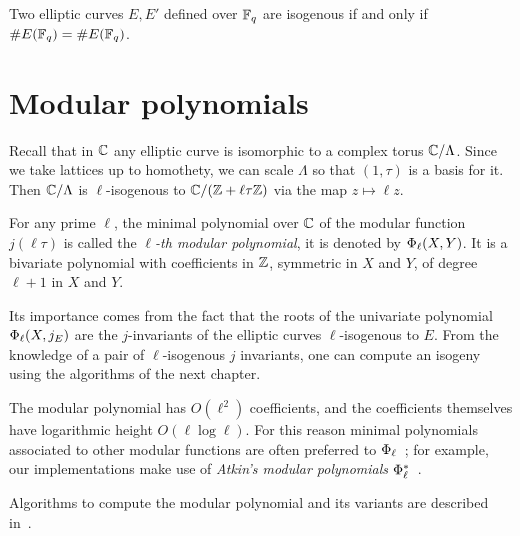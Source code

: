 \begin{theorem}
  Two elliptic curves $E,E'$ defined over $\mathbb{F}_q$ are isogenous if and
  only if $\# E(\mathbb{F}_q)=\# E(\mathbb{F}_q)$.
\end{theorem}


\section{Modular polynomials}
\label{sec:modular-polynomials}
Recall that in $\mathbb{C}$ any elliptic curve is isomorphic to a complex
torus $\mathbb{C}/\Lambda$. Since we take lattices up to homothety, we can
scale $\Lambda$ so that $(1,\tau)$ is a basis for it. Then
$\mathbb{C}/\Lambda$ is $\ell$-isogenous to $\mathbb{C}/(\mathbb{Z}+\ell\tau\mathbb{Z})$ via the map
$z\mapsto\ell z$.

For any prime $\ell$, the minimal polynomial over $\mathbb{C}$ of the modular
function $j(\ell\tau)$ is called the \emph{$\ell$-th modular polynomial}, it is denoted by
$\Phi_\ell(X,Y)$. It is a bivariate polynomial with coefficients in $\mathbb{Z}$,
symmetric in $X$ and $Y$, of degree $\ell+1$ in $X$ and $Y$.

Its importance comes from the fact that the roots of the univariate
polynomial $\Phi_\ell(X,j_E)$ are the $j$-invariants of the
elliptic curves $\ell$-isogenous to $E$. From the knowledge of a pair
of $\ell$-isogenous $j$ invariants, one can compute an isogeny using
the algorithms of the next chapter.

  The modular polynomial has $O(\ell^2)$
coefficients, and the coefficients themselves have logarithmic height
$O(\ell\log\ell)$. For this reason minimal polynomials associated to
other modular functions are often preferred to
$\Phi_\ell$~\cite{atkin88,enge+sutherland10}; for example, our
implementations make use of \emph{Atkin's modular polynomials}
$\Phi_\ell^\ast$~\cite{atkin88}.

Algorithms to compute the modular polynomial and its variants are
described in~\cite{morain95,sutherland10:modpol,enge+sutherland10}.







%

